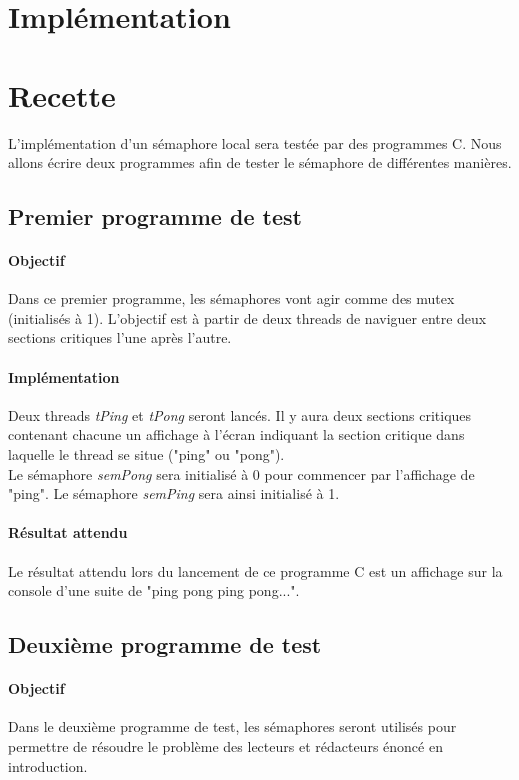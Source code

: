 \documentclass[12pt]{article}
\begin{document}
\newpage
\section{Implémentation}
\newpage
\section{Recette}
L'implémentation d'un sémaphore local sera testée par des programmes C. Nous allons écrire deux programmes afin de tester le sémaphore de différentes manières.
\subsection{Premier programme de test}
  \paragraph{Objectif\\}
  Dans ce premier programme, les sémaphores vont agir comme des mutex (initialisés à 1). L'objectif est à partir de deux threads de naviguer entre deux sections critiques l'une après l'autre.
  \paragraph{Implémentation\\}
  Deux threads \textit{tPing} et \textit{tPong} seront lancés. Il y aura deux sections critiques contenant chacune un affichage à l'écran indiquant la section critique dans laquelle le thread se situe ("ping" ou "pong"). \\
  Le sémaphore \textit{semPong} sera initialisé à 0 pour commencer par l'affichage de "ping". Le sémaphore \textit{semPing} sera ainsi initialisé à 1.
  \paragraph{Résultat attendu\\}
  Le résultat attendu lors du lancement de ce programme C est un affichage sur la console d'une suite de "ping pong ping pong...".
\newpage
\subsection{Deuxième programme de test}
  \paragraph{Objectif\\}
  Dans le deuxième programme de test, les sémaphores seront utilisés pour permettre de résoudre le problème des lecteurs et rédacteurs énoncé en introduction.
\end{document}
